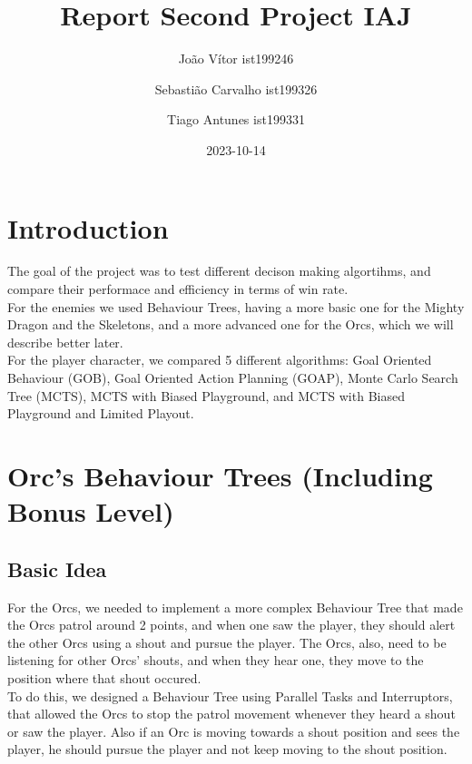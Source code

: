 \documentclass{article}
\title{Report Second Project IAJ}
\author{João Vítor ist199246
  \and Sebastião Carvalho ist199326
  \and Tiago Antunes ist199331}
\date{2023-10-14}
\begin{document}
  \maketitle
  \tableofcontents
  \newpage
  \section{Introduction}
  The goal of the project was to test different decison making algortihms, and compare their performace and efficiency in terms of win rate. \\
  For the enemies we used Behaviour Trees, having a more basic one for the Mighty Dragon and the Skeletons, and a more advanced one for the Orcs, 
  which we will describe better later.\\
  For the player character, we compared 5 different algorithms: Goal Oriented Behaviour (GOB), Goal Oriented Action Planning (GOAP), Monte Carlo Search Tree (MCTS),
  MCTS with Biased Playground, and MCTS with Biased Playground and Limited Playout.
  \section{Orc's Behaviour Trees (Including Bonus Level)}
  \subsection{Basic Idea}
  For the Orcs, we needed to implement a more complex Behaviour Tree that made the Orcs patrol around 2 points, and when one saw the player, they should alert the other Orcs
  using a shout and pursue the player. The Orcs, also, need to be listening for other Orcs' shouts, and when they hear one, they move to the position where that shout occured. \\
  To do this, we designed a Behaviour Tree using Parallel Tasks and Interruptors, that allowed the Orcs to stop the patrol movement whenever they heard a shout or 
  saw the player. Also if an Orc is moving towards a shout position and sees the player, he should pursue the player and not keep moving to the shout position.\\
\end{document}
